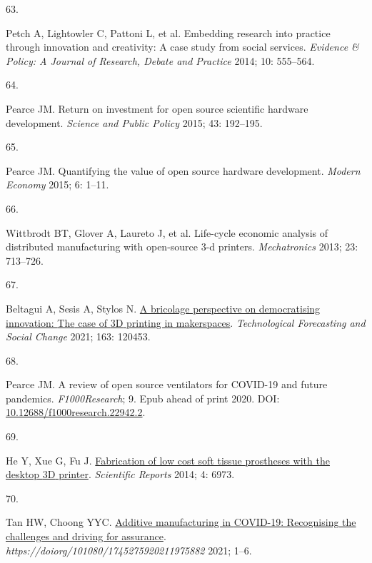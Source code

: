 \documentclass[
  12pt,
  a4paperpaper,
  onecolumn]{article}
\newlength{\cslhangindent}
\newlength{\csllabelwidth}
\newlength{\cslentryspacingunit} %
\newenvironment{CSLReferences}[2] %
 {%
  \setlength{\parindent}{0pt}
  \ifodd #1
  \let\oldpar\par
  \def\par{\hangindent=\cslhangindent\oldpar}
  \fi
  \setlength{\parskip}{#2\cslentryspacingunit}
 }%
 {}
\newcommand{\CSLLeftMargin}[1]{\parbox[t]{\csllabelwidth}{#1}}
\newcommand{\CSLRightInline}[1]{\parbox[t]{\linewidth - \csllabelwidth}{#1}\break}
\begin{document}
\begin{CSLReferences}{0}{0}
\leavevmode{}%
\CSLLeftMargin{63. }%
\CSLRightInline{Petch A, Lightowler C, Pattoni L, et al. Embedding
research into practice through innovation and creativity: A case study
from social services. \emph{Evidence \& Policy: A Journal of Research,
Debate and Practice} 2014; 10: 555--564.}

\leavevmode{}%
\CSLLeftMargin{64. }%
\CSLRightInline{Pearce JM. Return on investment for open source
scientific hardware development. \emph{Science and Public Policy} 2015;
43: 192--195.}

\leavevmode{}%
\CSLLeftMargin{65. }%
\CSLRightInline{Pearce JM. Quantifying the value of open source hardware
development. \emph{Modern Economy} 2015; 6: 1--11.}

\leavevmode{}%
\CSLLeftMargin{66. }%
\CSLRightInline{Wittbrodt BT, Glover A, Laureto J, et al. Life-cycle
economic analysis of distributed manufacturing with open-source 3-d
printers. \emph{Mechatronics} 2013; 23: 713--726.}

\leavevmode{}%
\CSLLeftMargin{67. }%
\CSLRightInline{Beltagui A, Sesis A, Stylos N.
\href{https://doi.org/10.1016/j.techfore.2020.120453}{A bricolage
perspective on democratising innovation: {The} case of {3D} printing in
makerspaces}. \emph{Technological Forecasting and Social Change} 2021;
163: 120453.}

\leavevmode{}%
\CSLLeftMargin{68. }%
\CSLRightInline{Pearce JM. A review of open source ventilators for
{COVID-19} and future pandemics. \emph{F1000Research}; 9. Epub ahead of
print 2020. DOI:
\href{https://doi.org/10.12688/f1000research.22942.2}{10.12688/f1000research.22942.2}.}

\leavevmode{}%
\CSLLeftMargin{69. }%
\CSLRightInline{He Y, Xue G, Fu J.
\href{https://doi.org/10.1038/srep06973}{Fabrication of low cost soft
tissue prostheses with the desktop {3D} printer}. \emph{Scientific
Reports} 2014; 4: 6973.}

\leavevmode{}%
\CSLLeftMargin{70. }%
\CSLRightInline{Tan HW, Choong YYC.
\href{https://doi.org/10.1080/17452759.2021.1975882}{Additive
manufacturing in {COVID-19}: Recognising the challenges and driving for
assurance}. \emph{https://doiorg/101080/1745275920211975882} 2021;
1--6.}


\end{CSLReferences}
\end{document}
